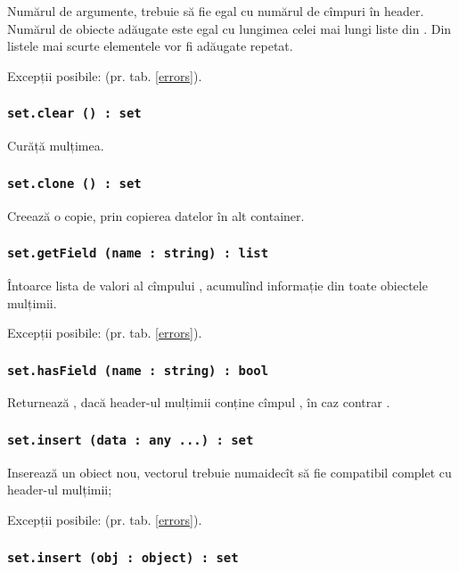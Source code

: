 Numărul de argumente, trebuie să fie egal cu numărul de cîmpuri în header. Numărul de obiecte adăugate este egal cu lungimea celei mai lungi liste din . Din listele mai scurte elementele vor fi adăugate repetat.

Excepții posibile:  (pr. tab. \ref{errors}).

\subsubsection{\lstinline|set.clear () : set|}

Curăță mulțimea.

\subsubsection{\lstinline|set.clone () : set|}

Creează o copie, prin copierea datelor în alt container.

\subsubsection{\lstinline|set.getField (name : string) : list|}

Întoarce lista de valori al cîmpului , acumulînd informație din toate obiectele mulțimii.

Excepții posibile:  (pr. tab. \ref{errors}).

\subsubsection{\lstinline|set.hasField (name : string) : bool|}

Returnează \true, dacă header-ul mulțimii conține cîmpul , în caz contrar \false.

\subsubsection{\lstinline|set.insert (data : any ...) : set|}

Inserează un obiect nou, vectorul  trebuie numaidecît să fie compatibil complet cu header-ul mulțimii;

Excepții posibile:  (pr. tab. \ref{errors}).

\subsubsection{\lstinline|set.insert (obj : object) : set|}

